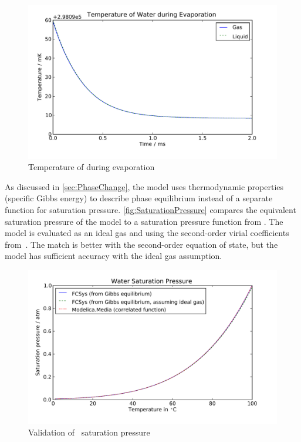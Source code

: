 \begin{figure}[htbp]
  \includegraphics[width=\linewidth]{Results/Basic/Evaporation/1/Temperature}%
  \caption{Temperature of  during evaporation}%
  \label{fig:EvaporationTemperature}
\end{figure}

As discussed in \autoref{sec:PhaseChange}, the model uses thermodynamic properties (specific Gibbs energy) to describe phase equilibrium instead of a separate function for saturation pressure.  \autoref{fig:SaturationPressure} compares the equivalent saturation pressure of the model to a saturation pressure function from .  The model is evaluated as an ideal gas and using the second-order virial coefficients from~\cite{Dymond2002}.  The match is better with the second-order equation of state, but the model has sufficient accuracy with the ideal gas assumption.

\begin{figure}[htbp]
  \includegraphics[width=\linewidth]{Results/Basic/Evaporation/2/SaturationPressure}%
  \caption{Validation of~ saturation pressure}%
  \label{fig:SaturationPressure}
\end{figure}


